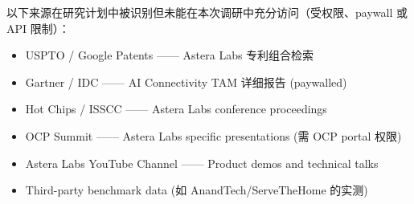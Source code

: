 以下来源在研究计划中被识别但未能在本次调研中充分访问（受权限、paywall 或 API 限制）：

\begin{itemize}
    \item USPTO / Google Patents —— Astera Labs 专利组合检索
    \item Gartner / IDC —— AI Connectivity TAM 详细报告 (paywalled)
    \item Hot Chips / ISSCC —— Astera Labs conference proceedings
    \item OCP Summit —— Astera Labs specific presentations (需 OCP portal 权限)
    \item Astera Labs YouTube Channel —— Product demos and technical talks
    \item Third-party benchmark data (如 AnandTech/ServeTheHome 的实测)
\end{itemize}
